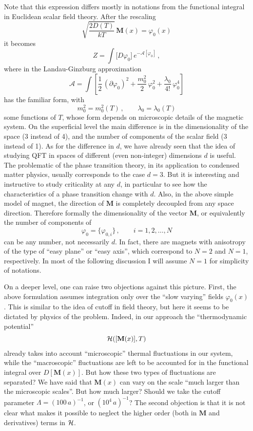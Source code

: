 Note that this expression differs mostly in notations from the functional
integral in Euclidean scalar field theory. After the rescaling
\[
\sqrt{\frac{2D(T)}{kT}}\,\mathbf M(x)=\varphi_0(x)
\]
it becomes
\[
Z=\int\bigl[D\varphi_0\bigr]\,e^{-\mathcal A[\varphi_0]}\,,
\]
where in the Landau-Ginzburg approximation
\[
\mathcal A=\int\left[\frac12\,(\partial\varphi_0)^2+\frac{m_0^2}2\,\varphi_0^2+\frac{\lambda_0}{4!}\,\varphi_0^4\right]
\]
has the familiar form, with
\[
m_0^2=m_0^2(T)\,,\qquad\lambda_0=\lambda_0(T)
\]
some functions of $T$, whose form depends on microscopic details of the magnetic
system. On the superficial level the main difference is in the dimensionality of
the space (3 instead of 4), and the number of components of the scalar field (3
instead of 1). As for the difference in $d$, we have already seen that the idea
of studying QFT in spaces of different (even non-integer) dimensions $d$ is
useful. The problematic of the phase transition theory, in its application to
condensed matter physics, usually corresponds to the case $d=3$. But it is
interesting and instructive to study criticality at any $d$, in particular to see
how the characteristics of a phase transition change with $d$. Also, in the above
simple model of magnet, the direction of $\mathbf M$ is completely decoupled from
any space direction. Therefore formally the dimensionality of the vector
$\mathbf M$, or equivalently the number of components of
\[
\varphi_0=\{\varphi_{0,i}\}\,,\qquad i=1,2,\dots,N
\]
can be any number, not necessarily $d$. In fact, there are magnets with
anisotropy of the type of ``easy plane'' or ``easy axis'', which correspond to
$N=2$ and $N=1$, respectively. In most of the following discussion I will assume
$N=1$ for simplicity of notations.

On a deeper level, one can raise two objections against this picture. First, the
above formulation assumes integration only over the ``slow varying'' fields
$\varphi_0(x)$. This is similar to the idea of cutoff in field theory, but here
it seems to be dictated by physics of the problem. Indeed, in our approach the
``thermodynamic potential''
\[
\mathcal{H}([\mathbf M(x)],T)
\]
already takes into account ``microscopic'' thermal fluctuations in our system,
while the ``macroscopic'' fluctuations are left to be accounted for in the
functional integral over $D[\mathbf M(x)]$. But how these two types of
fluctuations are separated? We have said that $\mathbf M(x)$ can vary on the
scale ``much larger than the microscopic scales''. But how much larger? Should we
take the cutoff parameter $\Lambda=(100\,a)^{-1}$, or $(10^4\,a)^{-1}$? The second
objection is that it is not clear what makes it possible to neglect the higher
order (both in $\mathbf M$ and derivatives) terms in $\mathcal{H}$.

